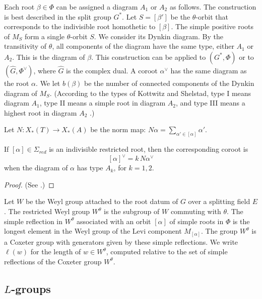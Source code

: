 Each root $\beta\in\Phi$ can be assigned a diagram $A_1$ or $A_2$ as
follows.  The construction is best described in the split group $G^*$.
Let $S=[\beta']$ be the $\theta$-orbit that corresponds to the
indivisible root homothetic to $[\beta]$.  The simple positive roots
of $M_S$ form a single $\theta$-orbit $S$.  We consider its Dynkin
diagram.  By the transitivity of $\theta$, all components of the
diagram have the same type, either $A_1$ or $A_2$.  This is the
diagram of $\beta$.  This construction can be applied to $(G^*,\Phi)$
or to $(\hat G,\Phi^\vee)$, where $\hat G$ is the complex dual.  A
coroot $\alpha^\vee$ has the same diagram as the root $\alpha$.  We let
$b(\beta)$ be the number of connected components of the Dynkin
diagram of $M_S$.  (According to the types of Kottwitz and Shelstad, type I
means diagram $A_1$, type II means a simple root in diagram $A_2$, and
type III means a highest root in diagram $A_2$
\cite{kottwitz1999foundations}.)

Let $N:X_*(T)\to X_*(A)$ be the norm map: 
$N\alpha = \sum_{\alpha'\in  [\alpha]} \alpha'$.

\begin{lemma}\label{lemma:norm}
 If $[\alpha]\in\Sigma_{red}$ is an indivisible restricted root, then
  the corresponding coroot is
\begin{equation}\label{eqn:norm}
[\alpha]^\vee = k\, N\alpha^\vee
\end{equation}
when the diagram of $\alpha$ has type $A_k$, for $k=1,2$.
\end{lemma}

\begin{proof}
(See \cite[1.3.9]{kottwitz1999foundations}.)
\end{proof}

Let $W$ be the Weyl group attached to the root datum of $G$ over a
splitting field $E$.  The restricted Weyl group $W^\theta$ is the
subgroup of $W$ commuting with $\theta$.  The simple reflection in
$W^\theta$ associated with an orbit $[\alpha]$ of simple roots in
$\Phi$ is the longest element in the Weyl group of the Levi component
$M_{[\alpha]}$.  The group $W^\theta$ is a Coxeter group with
generators given by these simple reflections.  We write $\ell(w)$ for
the length of $w\in W^\theta$, computed relative to the set of simple
reflections of the Coxeter group $W^\theta$.

\subsection{$L$-groups}\label{sec:L}

